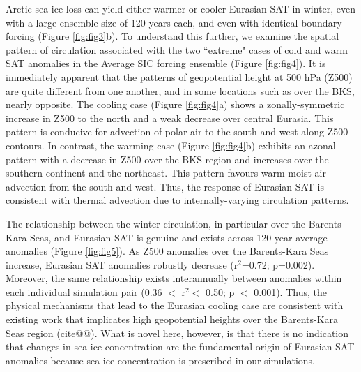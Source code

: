 \documentclass{nature}
\begin{document}
Arctic sea ice loss can yield either warmer or cooler Eurasian SAT in winter, even with a large ensemble size of 120-years each, and even with identical boundary forcing (Figure \ref{fig:fig3}b). To understand this further, we examine the spatial pattern of circulation associated with the two ``extreme" cases of cold and warm SAT anomalies in the Average SIC forcing ensemble (Figure \ref{fig:fig4}). It is immediately apparent that the patterns of geopotential height at 500 hPa (Z500) are quite different from one another, and in some locations such as over the BKS, nearly opposite. The cooling case (Figure \ref{fig:fig4}a) shows a zonally-symmetric increase in Z500 to the north and a weak decrease over central Eurasia. This pattern is conducive for advection of polar air to the south and west along Z500 contours. In contrast, the warming case (Figure \ref{fig:fig4}b) exhibits an azonal pattern with a decrease in Z500 over the BKS region and increases over the southern continent and the northeast. This pattern favours warm-moist air advection from the south and west. Thus, the response of Eurasian SAT is consistent with thermal advection due to internally-varying circulation patterns.

The relationship between the winter circulation, in particular over the Barents-Kara Seas, and Eurasian SAT is genuine and exists across 120-year average anomalies (Figure \ref{fig:fig5}). As Z500 anomalies over the Barents-Kara Seas increase, Eurasian SAT anomalies robustly decrease (r$^2$=0.72; p=0.002). Moreover, the same relationship exists interannually between anomalies within each individual simulation pair (0.36 $<$ r$^2<$ 0.50; p $<$ 0.001). Thus, the physical mechanisms that lead to the Eurasian cooling case are consistent with existing work that implicates high geopotential heights over the Barents-Kara Seas region (cite@@). What is novel here, however, is that there is no indication that changes in sea-ice concentration are the fundamental origin of Eurasian SAT anomalies because sea-ice concentration is prescribed in our simulations. 
\end{document}
